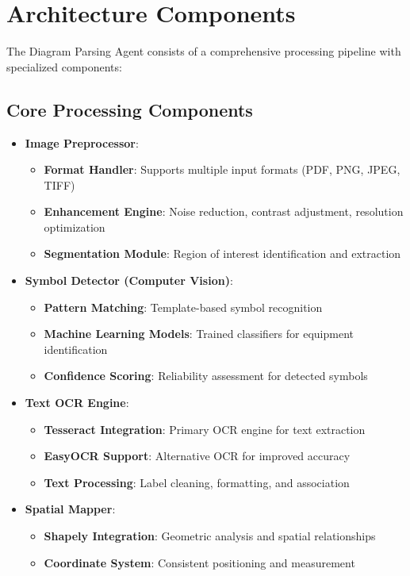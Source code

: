 \documentclass[12pt]{report}
\begin{document}
\section{Architecture Components}
The Diagram Parsing Agent consists of a comprehensive processing pipeline with specialized components:

\subsection{Core Processing Components}
\begin{itemize}
  \item \textbf{Image Preprocessor}:
    \begin{itemize}
      \item \textbf{Format Handler}: Supports multiple input formats (PDF, PNG, JPEG, TIFF)
      \item \textbf{Enhancement Engine}: Noise reduction, contrast adjustment, resolution optimization
      \item \textbf{Segmentation Module}: Region of interest identification and extraction
    \end{itemize}
  \item \textbf{Symbol Detector (Computer Vision)}:
    \begin{itemize}
      \item \textbf{Pattern Matching}: Template-based symbol recognition
      \item \textbf{Machine Learning Models}: Trained classifiers for equipment identification
      \item \textbf{Confidence Scoring}: Reliability assessment for detected symbols
    \end{itemize}
  \item \textbf{Text OCR Engine}:
    \begin{itemize}
      \item \textbf{Tesseract Integration}: Primary OCR engine for text extraction
      \item \textbf{EasyOCR Support}: Alternative OCR for improved accuracy
      \item \textbf{Text Processing}: Label cleaning, formatting, and association
    \end{itemize}
  \item \textbf{Spatial Mapper}:
    \begin{itemize}
      \item \textbf{Shapely Integration}: Geometric analysis and spatial relationships
      \item \textbf{Coordinate System}: Consistent positioning and measurement

\end{itemize}
\end{itemize}
\end{document}
